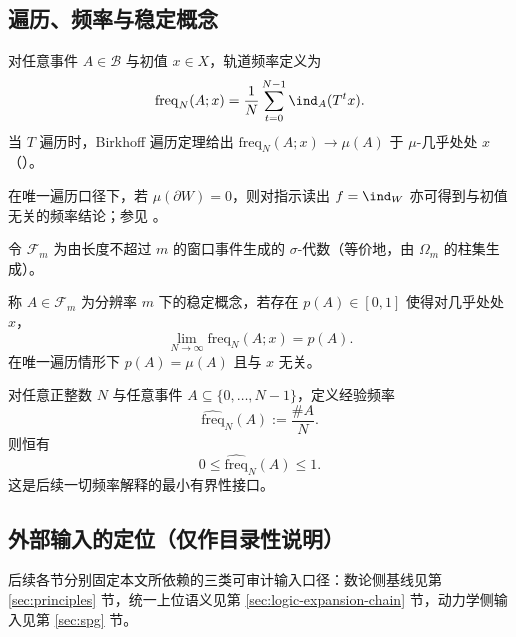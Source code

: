 \subsection{遍历、频率与稳定概念}\label{subsec:prelim-ergodic-frequency}
对任意事件 \(A\in\mathcal{B}\) 与初值 \(x\in X\)，轨道频率定义为
\[
\mathrm{freq}_N(A;x)=\frac1N\sum_{t=0}^{N-1}\ind_A(T^t x).
\]
当 \(T\) 遍历时，Birkhoff 遍历定理给出 \(\mathrm{freq}_N(A;x)\to\mu(A)\) 于 \(\mu\)-几乎处处 \(x\)（\cite{WaltersErgodicTheory}）。

\begin{remark}[唯一遍历下的指示函数]\label{rem:unique-ergodic-indicator}
在唯一遍历口径下，若 \(\mu(\partial W)=0\)，则对指示读出 \(f=\ind_W\) 亦可得到与初值无关的频率结论；参见 \cite{WaltersErgodicTheory}。
\end{remark}

令 \(\mathcal{F}_m\) 为由长度不超过 \(m\) 的窗口事件生成的 \(\sigma\)-代数（等价地，由 \(\Omega_m\) 的柱集生成）。
\begin{definition}[统计稳定概念]\label{def:stable-concept}
称 \(A\in\mathcal{F}_m\) 为分辨率 \(m\) 下的稳定概念，若存在 \(p(A)\in[0,1]\) 使得对几乎处处 \(x\)，
\[
\lim_{N\to\infty}\mathrm{freq}_N(A;x)=p(A).
\]
在唯一遍历情形下 \(p(A)=\mu(A)\) 且与 \(x\) 无关。
\end{definition}

\begin{proposition}[经验频率的单位区间约束]\label{prop:empirical-frequency-mem-unit-interval}
对任意正整数 \(N\) 与任意事件 \(A\subseteq\{0,\dots,N-1\}\)，定义经验频率
\[
\widehat{\mathrm{freq}}_N(A):=\frac{\#A}{N}.
\]
则恒有
\[
0\le \widehat{\mathrm{freq}}_N(A)\le 1.
\]
这是后续一切频率解释的最小有界性接口。
\end{proposition}

\subsection{外部输入的定位（仅作目录性说明）}\label{subsec:prelim-input-map}
后续各节分别固定本文所依赖的三类可审计输入口径：数论侧基线见第 \ref{sec:principles} 节，统一上位语义见第 \ref{sec:logic-expansion-chain} 节，动力学侧输入见第 \ref{sec:spg} 节。
